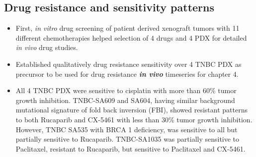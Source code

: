  \subsection{Drug resistance and sensitivity patterns}
\begin{itemize} 
     \item First, \textit{in vitro} drug screening of patient derived xenograft tumors with 11 different chemotherapies helped selection of 4 drugs and 4 PDX  for detailed \textit{in vivo} drug studies.
     
   \item  Established qualitatively drug resistance sensitivity over 4 TNBC PDX as precursor to be used for drug resistance \textbf{\textit{in vivo}} timeseries for chapter 4.
   
 \item All 4 TNBC PDX were sensitive to cisplatin with more than 60\% tumor growth inhibition. TNBC-SA609 and SA604, having similar background mutational signature of fold back inversion (FBI), showed resistant patterns to both Rucaparib and CX-5461 with less than 30\% tumor growth inhibition. However, TNBC SA535 with BRCA 1 deficiency, was sensitive to all but partially sensitive to Rucaparib. TNBC-SA1035 was partially sensitive to Paclitaxel, resistant to Rucaparib, but sensitive to Paclitaxel and CX-5461.

\end{itemize}

